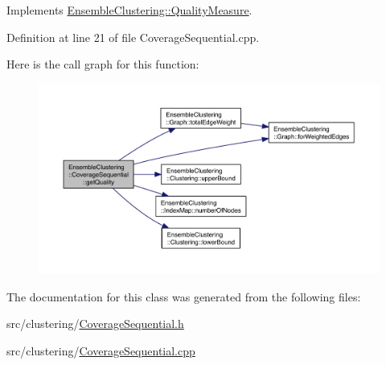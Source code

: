 Implements \hyperlink{class_ensemble_clustering_1_1_quality_measure_aadeac7e03b1fa099669d3b1e93edd1e9}{Ensemble\-Clustering\-::\-Quality\-Measure}.



Definition at line 21 of file Coverage\-Sequential.\-cpp.



Here is the call graph for this function\-:
\nopagebreak
\begin{figure}[H]
\begin{center}
\leavevmode
\includegraphics[width=350pt]{class_ensemble_clustering_1_1_coverage_sequential_a68a32f2a8c163d4891fb7c1a55bb3519_cgraph}
\end{center}
\end{figure}




The documentation for this class was generated from the following files\-:\begin{DoxyCompactItemize}
\item 
src/clustering/\hyperlink{_coverage_sequential_8h}{Coverage\-Sequential.\-h}\item 
src/clustering/\hyperlink{_coverage_sequential_8cpp}{Coverage\-Sequential.\-cpp}\end{DoxyCompactItemize}
